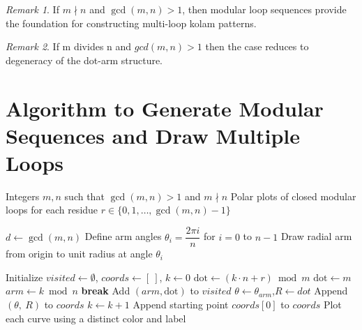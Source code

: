 \documentclass[12pt,a4paper]{article}
\theoremstyle{remark} %
\newtheorem{remark}{Remark}
\theoremstyle{example} %
\theoremstyle{proposition}
\begin{document}


\begin{remark}
    If \( m \nmid n \) and \( \gcd(m,n) > 1 \), then modular loop sequences provide the foundation for constructing multi-loop kolam patterns.
\end{remark}
\begin{remark}
    If m divides n and $gcd (m, n)>1$ then the case reduces to degeneracy of the dot-arm structure.
\end{remark}



\section{Algorithm to Generate Modular Sequences and Draw Multiple Loops} 


\begin{algorithm}[H]
\caption{Visualize Modular Sequences on Radial Arms}
\begin{algorithmic}[1]
\Require Integers $m, n$ such that $\gcd(m, n) > 1$ and $m \nmid n$
\Ensure Polar plots of closed modular loops for each residue $r \in \{0, 1, \dots, \gcd(m,n)-1\}$

\State $d \gets \gcd(m, n)$
\State Define arm angles $\theta_i = \dfrac{2\pi i}{n}$ for $i = 0$ to $n-1$
    \State Draw radial arm from origin to unit radius at angle $\theta_i$
\EndFor

    \State Initialize $visited \gets \emptyset$, \quad $coords \gets [\ ]$, \quad $k \gets 0$
        \State $\text{dot} \gets (k \cdot n + r) \bmod m$
            \State $\text{dot} \gets m$
        \EndIf
        \State $arm \gets k \bmod n$
            \State \textbf{break}
        \EndIf
        \State Add $(arm, \text{dot})$ to $visited$
        \State $\theta \gets \theta_{arm}$,\quad $R \gets dot$
        \State Append $(\theta,\ R)$ to $coords$
        \State $k \gets k + 1$
    \EndWhile
    \State Append starting point $coords[0]$ to $coords$
    \State Plot each curve using a distinct color and label
\EndFor
\end{algorithmic}
\end{algorithm}
\end{document}
